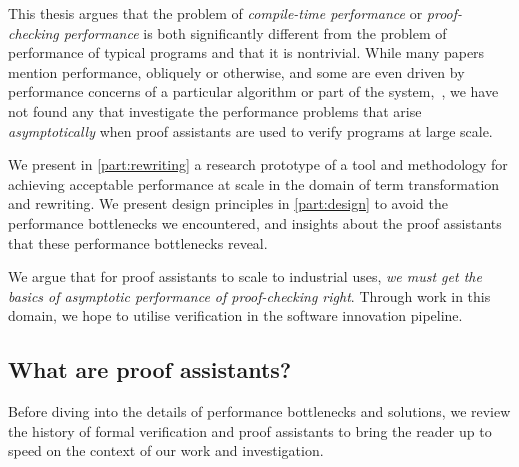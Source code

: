This thesis argues that the problem of \emph{compile-time performance} or \emph{proof-checking performance} is both significantly different from the problem of performance of typical programs and that it is nontrivial.
While many papers mention performance, obliquely or otherwise, and some are even driven by performance concerns of a particular algorithm or part of the system,~\cites[p.~1382]{gonthier2008formal}{Efficiency1994Boulton}{Proving2005Benjamin}{Idris2Faster2020Brady}{Recognizing1989Benanav}{mechanical1990Pierce}{CelikETAL17iCoq}{PalmskogETAL18piCoq}{vmcompute}{thesis-nogin}{Idris2Faster2020Brady}, we have not found any that investigate the performance problems that arise \emph{asymptotically} when proof assistants are used to verify programs at large scale.

We present in \autoref{part:rewriting} a research prototype of a tool and methodology for achieving acceptable performance at scale in the domain of term transformation and rewriting.
We present design principles in \autoref{part:design} to avoid the performance bottlenecks we encountered, and insights about the proof assistants that these performance bottlenecks reveal.

We argue that for proof assistants to scale to industrial uses, \emph{we must get the basics of asymptotic performance of proof-checking right}.
Through work in this domain, we hope to utilise verification in the software innovation pipeline.


\subsection{What are proof assistants?}\label{sec:intro:history}
%
Before diving into the details of performance bottlenecks and solutions, we review the history of formal verification and proof assistants to bring the reader up to speed on the context of our work and investigation.





